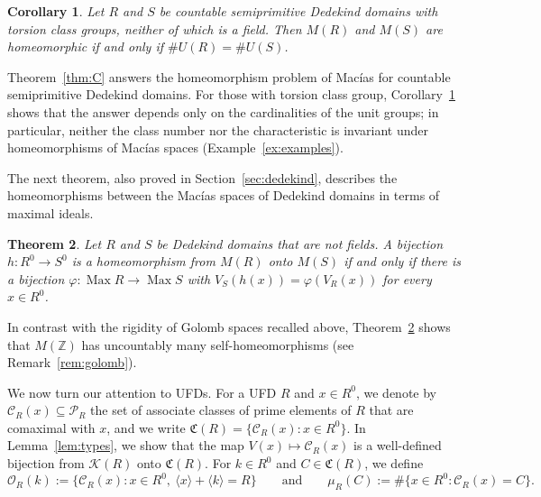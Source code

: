 \documentclass[12pt,reqno,a4paper]{amsart}
\newcommand{\Z}{\mathbb{Z}}
\newcommand{\Pe}{\mathcal{P}}
\newcommand{\K}{\mathcal{K}}
\DeclareMathOperator{\Max}{Max}
\theoremstyle{plain}
\newtheorem{theorem}{Theorem}[section]
\newtheorem{corollary}[theorem]{Corollary}
\theoremstyle{definition}
\begin{document}
\begin{corollary}\label{cor:countable}
Let $R$ and $S$ be countable semiprimitive Dedekind domains with torsion class groups, neither of which is a field. Then $M(R)$ and $M(S)$ are homeomorphic if and only if $\#U(R)=\#U(S)$.
\end{corollary}

Theorem~\ref{thm:C} answers the homeomorphism problem of Mac\'ias for countable semiprimitive Dedekind domains. For those with torsion class group, Corollary~\ref{cor:countable} shows that the answer depends only on the cardinalities of the unit groups; in particular, neither the class number nor the characteristic is invariant under homeomorphisms of Mac\'ias spaces (Example~\ref{ex:examples}). 

The next theorem, also proved in Section~\ref{sec:dedekind}, describes the homeomorphisms between the Mac\'ias spaces of Dedekind domains in terms of maximal ideals.

\begin{theorem}\label{cor:dedekind-homeo}
Let $R$ and $S$ be Dedekind domains that are not fields. A bijection $h\colon R^0\to S^0$ is a homeomorphism from $M(R)$ onto $M(S)$ if and only if there is a bijection $\varphi\colon\Max R\to\Max S$ with $V_S(h(x))=\varphi(V_R(x))$ for every $x\in R^0$.
\end{theorem} 

In contrast with the rigidity of Golomb spaces recalled above, Theorem~\ref{cor:dedekind-homeo} shows that $M(\Z)$ has uncountably many self-homeomorphisms (see Remark~\ref{rem:golomb}).

We now turn our attention to UFDs. For a UFD $R$ and $x\in R^0$, we denote by $\mathcal{C}_R(x)\subseteq\Pe_R$ the set of associate classes of prime elements of $R$ that are comaximal with $x$, and we write $\mathfrak{C}(R)=\{\mathcal{C}_R(x):x\in R^0\}$. In Lemma~\ref{lem:types}, we show that the map $V(x)\mapsto\mathcal{C}_R(x)$ is a well-defined bijection from $\K(R)$ onto $\mathfrak{C}(R)$. For $k\in R^0$ and $C\in\mathfrak{C}(R)$, we define
\[
\mathcal{O}_R(k):=\{\mathcal{C}_R(x):x\in R^0,\ \langle x\rangle+\langle k\rangle=R\}\qquad\text{and}\qquad\mu_R(C):=\#\{x\in R^0:\mathcal{C}_R(x)=C\}.
\]
\end{document}
